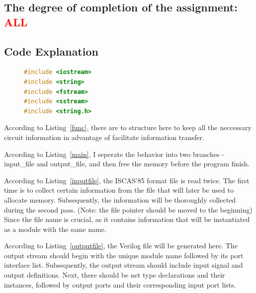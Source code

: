 \documentclass{article}
\begin{document}
\subsection{The degree of completion of the assignment: \textcolor{red}{ALL}}

\subsection{Code Explanation}

\begin{figure}[H]
\begin{lstlisting}[language = {c++},caption={Preprocessor}, label={library}]
#include <iostream>
#include <string>
#include <fstream>
#include <sstream>
#include <string.h>
\end{lstlisting}
\end{figure}
\vspace*{-1em}

According to \noindent Listing~\ref{func}, there are to structure here to keep all the neccessary circuit information in advantage of facilitate information transfer.




According to \noindent Listing~\ref{main}, I seperate the behavior into two branches - input\_file and output\_file, and then free the memory before the program finish.
 


According to Listing~\ref{inputfile}, the ISCAS'85 format file is read twice. The first time is to collect certain information from the file that will later be used to allocate memory. Subsequently, the information will be thoroughly collected during the second pass. (Note: the file pointer should be moved to the beginning) Since the file name is crucial, as it contains information that will be instantiated as a module with the same name.



According to Listing~\ref{outputfile}, the Verilog file will be generated here. The output stream should begin with the unique module name followed by its port interface list. Subsequently, the output stream should include input signal and output definitions. Next, there should be net type declarations and their instances, followed by output ports and their corresponding input port lists.
\end{document}

